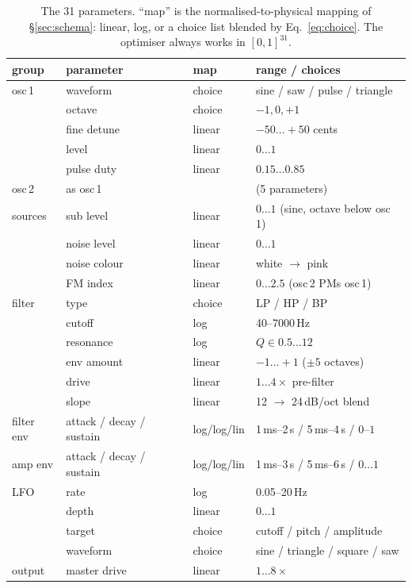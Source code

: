 \documentclass[11pt]{article}
\begin{document}
\begin{table}[h]
\centering
\small
\caption{The 31 parameters. ``map'' is the normalised-to-physical mapping of
\S\ref{sec:schema}: linear, log, or a choice list blended by
Eq.~\eqref{eq:choice}. The optimiser always works in $[0,1]^{31}$.}
\label{tab:schema}
\begin{tabular}{llll}
\toprule
group & parameter & map & range / choices \\
\midrule
osc\,1 & waveform & choice & sine / saw / pulse / triangle \\
       & octave & choice & $-1, 0, +1$ \\
       & fine detune & linear & $-50 \dots +50$ cents \\
       & level & linear & $0\dots1$ \\
       & pulse duty & linear & $0.15 \dots 0.85$ \\
osc\,2 & as osc\,1 & & (5 parameters) \\
sources & sub level & linear & $0\dots1$ (sine, octave below osc\,1) \\
        & noise level & linear & $0\dots1$ \\
        & noise colour & linear & white $\rightarrow$ pink \\
        & FM index & linear & $0 \dots 2.5$ (osc\,2 PMs osc\,1) \\
filter & type & choice & LP / HP / BP \\
       & cutoff & log & 40--7000\,Hz \\
       & resonance & log & $Q \in 0.5 \dots 12$ \\
       & env amount & linear & $-1 \dots +1$ ($\pm5$ octaves) \\
       & drive & linear & $1\dots4\times$ pre-filter \\
       & slope & linear & 12 $\rightarrow$ 24\,dB/oct blend \\
filter env & attack / decay / sustain & log/log/lin &
  1\,ms--2\,s / 5\,ms--4\,s / $0$--$1$ \\
amp env & attack / decay / sustain & log/log/lin &
  1\,ms--3\,s / 5\,ms--6\,s / $0\dots1$ \\
LFO & rate & log & 0.05--20\,Hz \\
    & depth & linear & $0\dots1$ \\
    & target & choice & cutoff / pitch / amplitude \\
    & waveform & choice & sine / triangle / square / saw \\
output & master drive & linear & $1\dots8\times$ \\
\bottomrule
\end{tabular}
\end{table}
\end{document}
